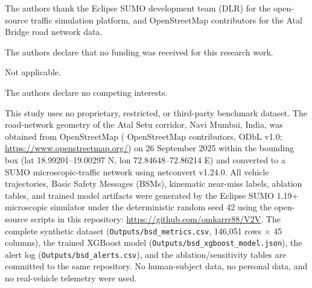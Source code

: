 \documentclass[sn-mathphys-num,Numbered,iicol]{sn-jnl}
\begin{document}
The authors thank the Eclipse SUMO development team (DLR) for the open-source traffic simulation platform, and OpenStreetMap contributors for the Atal Bridge road network data.

The authors declare that no funding was received for this research work.

Not applicable.

The authors declare no competing interests.

This study uses no proprietary, restricted, or third-party benchmark dataset. The road-network geometry of the Atal Setu corridor, Navi Mumbai, India, was obtained from OpenStreetMap (\textcopyright{} OpenStreetMap contributors, ODbL v1.0; \url{https://www.openstreetmap.org/}) on 26 September 2025 within the bounding box (lat 18.99201--19.00297\textdegree{} N, lon 72.84648--72.86214\textdegree{} E) and converted to a SUMO microscopic-traffic network using netconvert v1.24.0. All vehicle trajectories, Basic Safety Messages (BSMs), kinematic near-miss labels, ablation tables, and trained model artifacts were generated by the Eclipse SUMO 1.19+ microscopic simulator under the deterministic random seed 42 using the open-source scripts in this repository: \url{https://github.com/omkarrr88/V2V}. The complete synthetic dataset (\texttt{Outputs/bsd\_metrics.csv}, 146,051 rows $\times$ 45 columns), the trained XGBoost model (\texttt{Outputs/bsd\_xgboost\_model.json}), the alert log (\texttt{Outputs/bsd\_alerts.csv}), and the ablation/sensitivity tables are committed to the same repository. No human-subject data, no personal data, and no real-vehicle telemetry were used.
\end{document}
